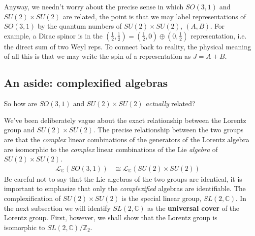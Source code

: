 Anyway, we needn't worry about the precise sense in which $SO(3,1)$ and $SU(2)\times SU(2)$ are related, the point is that we may label representations of $SO(3,1)$ by the quantum numbers of $SU(2)\times SU(2)$, $(A,B)$. For example, a Dirac spinor is in the $(\frac 12, \frac 12)=(\frac 12, 0)\oplus (0,\frac 12)$ representation, i.e. the direct sum of two Weyl reps. 
To connect back to reality, the physical meaning of all this is that we may write the spin of a representation as $J=A+B$.


\subsection{An aside: complexified algebras}
So how are $SO(3,1)$ and $SU(2)\times SU(2)$ \textit{actually} related?

We've been deliberately vague about the exact relationship between the Lorentz group and $SU(2)\times SU(2)$. The precise relationship between the two groups are that the \textit{complex} linear combinations of the generators of the Lorentz algebra are isomorphic to the \textit{complex} linear combinations of the Lie \textit{algebra} of $SU(2)\times SU(2)$. 
    \begin{align}
        \mathcal L_{\mathbb{C}}(SO(3,1)) &\cong \mathcal L_{\mathbb{C}}(SU(2)\times SU(2))
    \end{align}
    Be careful not to say that the Lie algebras of the two groups are identical, it is important to emphasize that only the \textit{complexified} algebras are identifiable. 
    The complexification of $SU(2)\times SU(2)$ is the special linear group, $SL(2,\mathbb C)$. In the next subsection we will identify $SL(2,\mathbb C)$ as the \textbf{universal cover} of the Lorentz group. First, however, we shall show that the Lorentz group is isomorphic to $SL(2,\mathbb C)/\mathbb{Z}_2$. %



